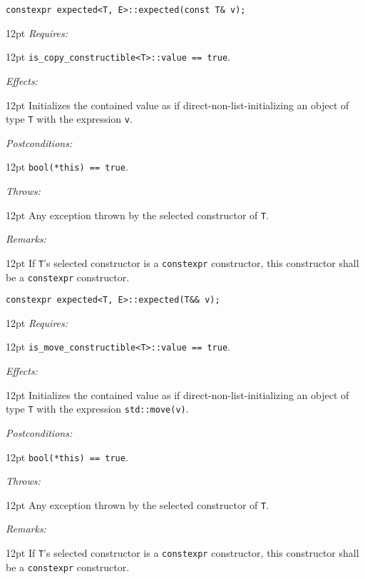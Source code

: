 \documentclass[a4paper,10pt]{article}
\newcommand{\cpp}[1]{\lstinline{#1}}
\newcommand{\wordingItem}[1]{\noindent\textit{#1:}}
\newenvironment{wordingTextItem}[1]{\wordingItem{#1}\vspace{7pt}\noindent\begin{adjustwidth}{12pt}{}}{\vspace{7pt}\end{adjustwidth}}
\newenvironment{wordingPara}{\begin{adjustwidth}{12pt}{}}{\end{adjustwidth}}
\begin{document}
\begin{lstlisting}[xleftmargin=0pt]
constexpr expected<T, E>::expected(const T& v);
\end{lstlisting}
\begin{wordingPara}
\begin{wordingTextItem}{Requires}
\cpp{is_copy_constructible<T>::value == true}. 
\end{wordingTextItem}
\begin{wordingTextItem}{Effects}
Initializes the contained value as if direct-non-list-initializing an object of type \cpp{T} with the expression \cpp{v}.
\end{wordingTextItem}
\begin{wordingTextItem}{Postconditions}
\cpp{bool(*this) == true}.
\end{wordingTextItem}
\begin{wordingTextItem}{Throws}
Any exception thrown by the selected constructor of \cpp{T}.
\end{wordingTextItem}
\begin{wordingTextItem}{Remarks}
If \cpp{T}'s selected constructor is a \cpp{constexpr} constructor, this constructor shall be a \cpp{constexpr} constructor.
\end{wordingTextItem}
\end{wordingPara}

\begin{lstlisting}[xleftmargin=0pt]
constexpr expected<T, E>::expected(T&& v); 
\end{lstlisting}
\begin{wordingPara}
\begin{wordingTextItem}{Requires}
\cpp{is_move_constructible<T>::value == true}.
\end{wordingTextItem}
\begin{wordingTextItem}{Effects}
Initializes the contained value as if direct-non-list-initializing an object of type \cpp{T} with the expression \cpp{std::move(v)}.
\end{wordingTextItem}
\begin{wordingTextItem}{Postconditions}
\cpp{bool(*this) == true}.
\end{wordingTextItem}
\begin{wordingTextItem}{Throws}
Any exception thrown by the selected constructor of \cpp{T}.
\end{wordingTextItem}
\begin{wordingTextItem}{Remarks}
If \cpp{T}'s selected constructor is a \cpp{constexpr} constructor, this constructor shall be a \cpp{constexpr} constructor.
\end{wordingTextItem}
\end{wordingPara}
\end{document}

